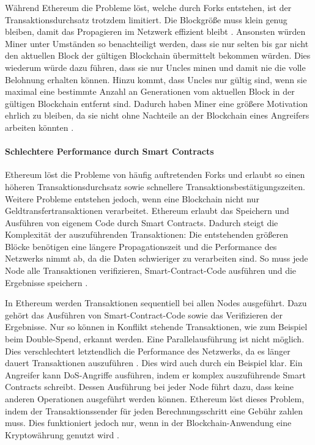 Während Ethereum die Probleme löst, welche durch Forks entstehen, ist der Transaktionsdurchsatz trotzdem limitiert. Die Blockgröße muss klein genug bleiben, damit das Propagieren im Netzwerk effizient bleibt \cite{SchererPerformanceScalabilityBlockchain2017}. Ansonsten würden Miner unter Umständen so benachteiligt werden, dass sie nur selten bis gar nicht den aktuellen Block der gültigen Blockchain übermittelt bekommen würden. Dies wiederum würde dazu führen, dass sie nur Uncles minen und damit nie die volle Belohnung erhalten können. Hinzu kommt, dass Uncles nur gültig sind, wenn sie maximal eine bestimmte Anzahl an Generationen vom aktuellen Block in der gültigen Blockchain entfernt sind. Dadurch haben Miner eine größere Motivation ehrlich zu bleiben, da sie nicht ohne Nachteile an der Blockchain eines Angreifers arbeiten könnten \cite{EthereumTeamEthereumWhitePaper2017}.

\paragraph{Schlechtere Performance durch Smart Contracts}
Ethereum löst die Probleme von häufig auftretenden Forks und erlaubt so einen höheren Transaktionsdurchsatz sowie schnellere Transaktionsbestätigungszeiten. Weitere Probleme entstehen jedoch, wenn eine Blockchain nicht nur Geldtransfertransaktionen verarbeitet. Ethereum erlaubt das Speichern und Ausführen von eigenem Code durch Smart Contracts. Dadurch steigt die Komplexität der auszuführenden Transaktionen: Die entstehenden größeren Blöcke benötigen eine längere Propagationszeit und die Performance des Netzwerks nimmt ab, da die Daten schwieriger zu verarbeiten sind. So muss jede Node alle Transaktionen verifizieren, Smart-Contract-Code ausführen und die Ergebnisse speichern \cite{SchererPerformanceScalabilityBlockchain2017}. 

In Ethereum werden Transaktionen sequentiell bei allen Nodes ausgeführt. Dazu gehört das Ausführen von Smart-Contract-Code sowie das Verifizieren der Ergebnisse. Nur so können in Konflikt stehende Transaktionen, wie zum Beispiel beim Double-Spend, erkannt werden. Eine Parallelausführung ist nicht möglich. Dies verschlechtert letztendlich die Performance des Netzwerks, da es länger dauert Transaktionen auszuführen \cite{SchererPerformanceScalabilityBlockchain2017}. Dies wird auch durch ein Beispiel klar. Ein Angreifer kann DoS-Angriffe ausführen, indem er komplex auszuführende Smart Contracts schreibt. Dessen Ausführung bei jeder Node führt dazu, dass keine anderen Operationen ausgeführt werden können. Ethereum löst dieses Problem, indem der Transaktionssender für jeden Berechnungsschritt eine Gebühr zahlen muss. Dies funktioniert jedoch nur, wenn in der Blockchain-Anwendung eine Kryptowährung genutzt wird \cite{VukolicRethinkingPermissionedBlockchains2017}. 

